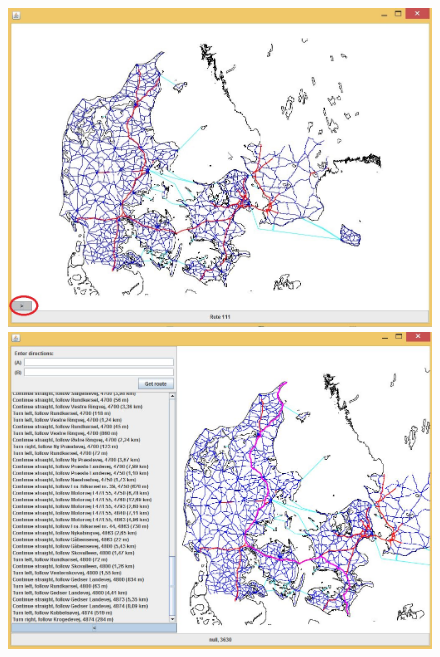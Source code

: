 \begin{figure}
\centering
\begin{minipage}{.5\textwidth}
  \centering
	\includegraphics[width=(0.95\textwidth)]{brugervejledning/halvrenkort}
  \end{minipage}%
\begin{minipage}{.5\textwidth}
  \centering
\includegraphics[width=(0.95\textwidth)]{brugervejledning/klikkort}
\end{minipage}
\end{figure}
